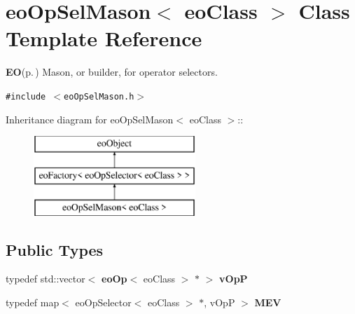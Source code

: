 \section{eo\-Op\-Sel\-Mason$<$ eo\-Class $>$ Class Template Reference}
\label{classeo_op_sel_mason}
{\bf EO}{\rm (p.\,\pageref{class_e_o})} Mason, or builder, for operator selectors.  


{\tt \#include $<$eo\-Op\-Sel\-Mason.h$>$}

Inheritance diagram for eo\-Op\-Sel\-Mason$<$ eo\-Class $>$::\begin{figure}[H]
\begin{center}
\leavevmode
\includegraphics[height=3cm]{classeo_op_sel_mason}
\end{center}
\end{figure}
\subsection*{Public Types}
\begin{CompactItemize}
\item 
typedef std::vector$<$ {\bf eo\-Op}$<$ eo\-Class $>$ $\ast$ $>$ {\bf v\-Op\-P}\label{classeo_op_sel_mason_w0}

\item 
typedef map$<$ eo\-Op\-Selector$<$ eo\-Class $>$ $\ast$, v\-Op\-P $>$ {\bf MEV}\label{classeo_op_sel_mason_w1}

\end{CompactItemize}
